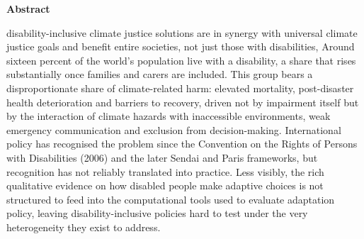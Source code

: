 \documentclass[12pt,a4paper]{report}
\begin{document}

\vspace*{3cm}

\begin{center}
{\Huge\bfseries Abstract\par}
\end{center}
disability-inclusive
climate justice solutions are in synergy with universal climate justice goals and benefit entire societies, not just those with disabilities, Around sixteen percent of the world's population live with a disability, a share that rises substantially once families and carers are included. This group bears a disproportionate share of climate-related harm: elevated mortality, post-disaster health deterioration and barriers to recovery, driven not by impairment itself but by the interaction of climate hazards with inaccessible environments, weak emergency communication and exclusion from decision-making. International policy has recognised the problem since the Convention on the Rights of Persons with Disabilities (2006) and the later Sendai and Paris frameworks, but recognition has not reliably translated into practice. Less visibly, the rich qualitative evidence on how disabled people make adaptive choices is not structured to feed into the computational tools used to evaluate adaptation policy, leaving disability-inclusive policies hard to test under the very heterogeneity they exist to address.
\end{document}
